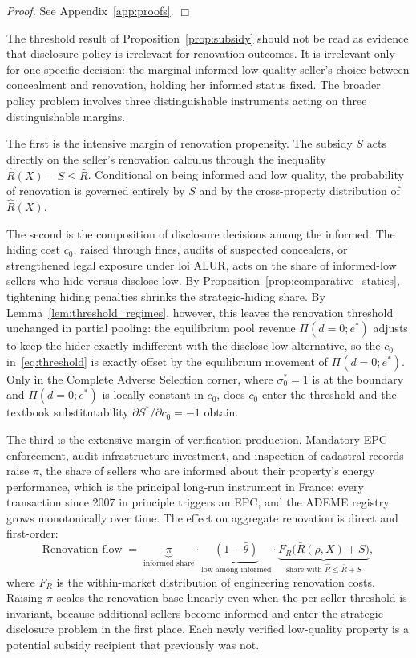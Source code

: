 \documentclass[10pt,letterpaper]{bp-template-concise}
\begin{document}
\noindent\textit{Proof.} See Appendix~\ref{app:proofs}. $\Box$

\medskip

The threshold result of Proposition~\ref{prop:subsidy} should not be read as evidence that disclosure policy is irrelevant for renovation outcomes. It is irrelevant only for one specific decision: the marginal informed low-quality seller's choice between concealment and renovation, holding her informed status fixed. The broader policy problem involves three distinguishable instruments acting on three distinguishable margins.

The first is the intensive margin of renovation propensity. The subsidy $S$ acts directly on the seller's renovation calculus through the inequality $\hat R(X) - S \le \bar R$. Conditional on being informed and low quality, the probability of renovation is governed entirely by $S$ and by the cross-property distribution of $\hat R(X)$.

The second is the composition of disclosure decisions among the informed. The hiding cost $c_0$, raised through fines, audits of suspected concealers, or strengthened legal exposure under loi ALUR, acts on the share of informed-low sellers who hide versus disclose-low. By Proposition~\ref{prop:comparative_statics}, tightening hiding penalties shrinks the strategic-hiding share. By Lemma~\ref{lem:threshold_regimes}, however, this leaves the renovation threshold unchanged in partial pooling: the equilibrium pool revenue $\Pi(d=0;e^*)$ adjusts to keep the hider exactly indifferent with the disclose-low alternative, so the $c_0$ in~\eqref{eq:threshold} is exactly offset by the equilibrium movement of $\Pi(d=0;e^*)$. Only in the Complete Adverse Selection corner, where $\sigma_0^*=1$ is at the boundary and $\Pi(d=0;e^*)$ is locally constant in $c_0$, does $c_0$ enter the threshold and the textbook substitutability $\partial S^*/\partial c_0 = -1$ obtain.

The third is the extensive margin of verification production. Mandatory EPC enforcement, audit infrastructure investment, and inspection of cadastral records raise $\pi$, the share of sellers who are informed about their property's energy performance, which is the principal long-run instrument in France: every transaction since 2007 in principle triggers an EPC, and the ADEME registry grows monotonically over time. The effect on aggregate renovation is direct and first-order:
\begin{equation}
    \text{Renovation flow} \;=\; \underbrace{\pi}_{\text{informed share}} \cdot \underbrace{(1-\bar\theta)}_{\text{low among informed}} \cdot \underbrace{F_R\big(\bar R(\rho, X) + S\big)}_{\text{share with }\hat R\le\bar R + S},
    \label{eq:renovation_flow}
\end{equation}
where $F_R$ is the within-market distribution of engineering renovation costs. Raising $\pi$ scales the renovation base linearly even when the per-seller threshold is invariant, because additional sellers become informed and enter the strategic disclosure problem in the first place. Each newly verified low-quality property is a potential subsidy recipient that previously was not.
\end{document}
